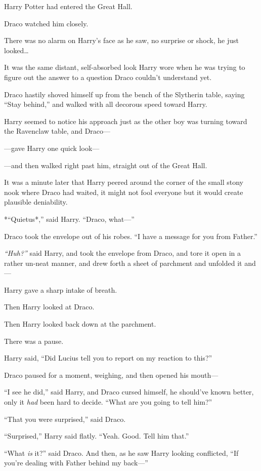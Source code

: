 Harry Potter had entered the Great Hall.

Draco watched him closely.

There was no alarm on Harry's face as he saw, no surprise or shock, he
just looked\ldots{}

It was the same distant, self-absorbed look Harry wore when he was
trying to figure out the answer to a question Draco couldn't understand
yet.

Draco hastily shoved himself up from the bench of the Slytherin table,
saying ``Stay behind,'' and walked with all decorous speed toward Harry.

Harry seemed to notice his approach just as the other boy was turning
toward the Ravenclaw table, and Draco---

---gave Harry one quick look---

---and then walked right past him, straight out of the Great Hall.

It was a minute later that Harry peered around the corner of the small
stony nook where Draco had waited, it might not fool everyone but it
would create plausible deniability.

*``Quietus*,'' said Harry. ``Draco, what---''

Draco took the envelope out of his robes. ``I have a message for you
from Father.''

\emph{``Huh?''} said Harry, and took the envelope from Draco, and tore
it open in a rather un-neat manner, and drew forth a sheet of parchment
and unfolded it and---

Harry gave a sharp intake of breath.

Then Harry looked at Draco.

Then Harry looked back down at the parchment.

There was a pause.

Harry said, ``Did Lucius tell you to report on my reaction to this?''

Draco paused for a moment, weighing, and then opened his mouth---

``I see he did,'' said Harry, and Draco cursed himself, he should've
known better, only it \emph{had} been hard to decide. ``What are you
going to tell him?''

``That you were surprised,'' said Draco.

``Surprised,'' Harry said flatly. ``Yeah. Good. Tell him that.''

``What \emph{is} it?'' said Draco. And then, as he saw Harry looking
conflicted, ``If you're dealing with Father behind my back---''

